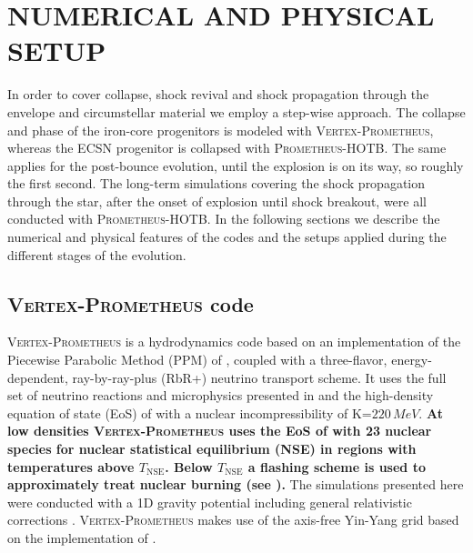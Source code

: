 \documentclass[fleqn,usenatbib]{mnras}
\newcommand{\prom}{\textsc{Prometheus-HOTB}\xspace}
\newcommand{\vertexprom}{\textsc{Vertex-Prometheus}\xspace}
\begin{document}
\section{NUMERICAL AND PHYSICAL SETUP}
\label{sec:Numerical and physical Setup}
In order to cover collapse, shock revival and shock propagation through the envelope and circumstellar material we employ a step-wise approach.
The collapse and phase of the iron-core progenitors is modeled with \vertexprom, whereas the ECSN progenitor is collapsed with \prom.
The same applies for the post-bounce evolution, until the explosion is on its way, so roughly the first second. 
The long-term simulations covering the shock propagation through the star, after the onset of explosion until shock breakout, were all conducted with \prom.
In the following sections we describe the numerical and physical features of the codes and the setups applied during the different stages of the evolution.

\subsection{\vertexprom code}
\vertexprom is a hydrodynamics code based on an implementation of the Piecewise Parabolic Method (PPM) of \cite{Colella1984}, coupled with a three-flavor, energy-dependent, ray-by-ray-plus (RbR+) 
neutrino transport scheme. It uses the full set of neutrino reactions and microphysics presented in \cite{Buras2006} and the high-density equation of state (EoS) of \cite{Lattimer1991} with a nuclear incompressibility of $\mathrm{K}\mathord{=} 220\,\mathord{MeV}$.
\textbf{At low densities \vertexprom uses the EoS of \cite{Janka1999} with 23 nuclear species for nuclear statistical equilibrium (NSE) in regions with temperatures above $T_{\mathrm{NSE}}$. Below $T_{\mathrm{NSE}}$ a flashing scheme is used to approximately treat nuclear burning (see \citealt{Rampp2002}). }
The simulations presented here were conducted with a 1D gravity potential including general relativistic corrections \citep{Marek2006}. \vertexprom makes use of the axis-free Yin-Yang grid \citep{Kageyama2004} based on the implementation of \cite{Melson2016}.
\end{document}
